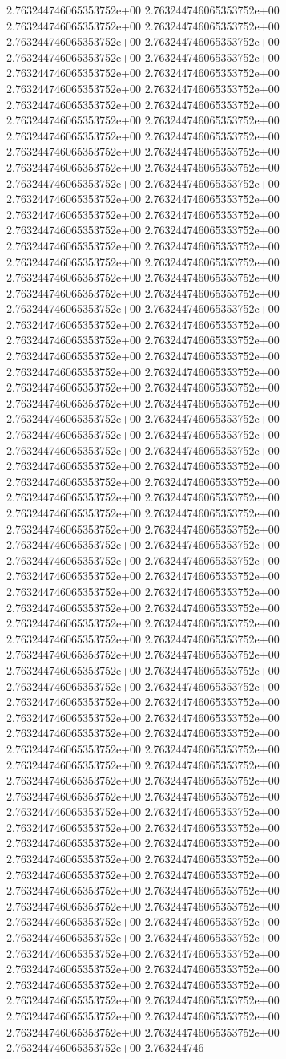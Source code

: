 2.763244746065353752e+00	2.763244746065353752e+00	2.763244746065353752e+00	2.763244746065353752e+00	2.763244746065353752e+00	2.763244746065353752e+00	2.763244746065353752e+00	2.763244746065353752e+00	2.763244746065353752e+00	2.763244746065353752e+00	2.763244746065353752e+00	2.763244746065353752e+00	2.763244746065353752e+00	2.763244746065353752e+00	2.763244746065353752e+00	2.763244746065353752e+00	2.763244746065353752e+00	2.763244746065353752e+00	2.763244746065353752e+00	2.763244746065353752e+00	2.763244746065353752e+00	2.763244746065353752e+00	2.763244746065353752e+00	2.763244746065353752e+00	2.763244746065353752e+00	2.763244746065353752e+00	2.763244746065353752e+00	2.763244746065353752e+00	2.763244746065353752e+00	2.763244746065353752e+00	2.763244746065353752e+00	2.763244746065353752e+00	2.763244746065353752e+00	2.763244746065353752e+00	2.763244746065353752e+00	2.763244746065353752e+00	2.763244746065353752e+00	2.763244746065353752e+00	2.763244746065353752e+00	2.763244746065353752e+00	2.763244746065353752e+00	2.763244746065353752e+00	2.763244746065353752e+00	2.763244746065353752e+00	2.763244746065353752e+00	2.763244746065353752e+00	2.763244746065353752e+00	2.763244746065353752e+00	2.763244746065353752e+00	2.763244746065353752e+00	2.763244746065353752e+00	2.763244746065353752e+00	2.763244746065353752e+00	2.763244746065353752e+00	2.763244746065353752e+00	2.763244746065353752e+00	2.763244746065353752e+00	2.763244746065353752e+00	2.763244746065353752e+00	2.763244746065353752e+00	2.763244746065353752e+00	2.763244746065353752e+00	2.763244746065353752e+00	2.763244746065353752e+00	2.763244746065353752e+00	2.763244746065353752e+00	2.763244746065353752e+00	2.763244746065353752e+00	2.763244746065353752e+00	2.763244746065353752e+00	2.763244746065353752e+00	2.763244746065353752e+00	2.763244746065353752e+00	2.763244746065353752e+00	2.763244746065353752e+00	2.763244746065353752e+00	2.763244746065353752e+00	2.763244746065353752e+00	2.763244746065353752e+00	2.763244746065353752e+00	2.763244746065353752e+00	2.763244746065353752e+00	2.763244746065353752e+00	2.763244746065353752e+00	2.763244746065353752e+00	2.763244746065353752e+00	2.763244746065353752e+00	2.763244746065353752e+00	2.763244746065353752e+00	2.763244746065353752e+00	2.763244746065353752e+00	2.763244746065353752e+00	2.763244746065353752e+00	2.763244746065353752e+00	2.763244746065353752e+00	2.763244746065353752e+00	2.763244746065353752e+00	2.763244746065353752e+00	2.763244746065353752e+00	2.763244746065353752e+00	2.763244746065353752e+00	2.763244746065353752e+00	2.763244746065353752e+00	2.763244746065353752e+00	2.763244746065353752e+00	2.763244746065353752e+00	2.763244746065353752e+00	2.763244746065353752e+00	2.763244746065353752e+00	2.763244746065353752e+00	2.763244746065353752e+00	2.763244746065353752e+00	2.763244746065353752e+00	2.763244746065353752e+00	2.763244746065353752e+00	2.763244746065353752e+00	2.763244746065353752e+00	2.763244746065353752e+00	2.763244746065353752e+00	2.763244746065353752e+00	2.763244746065353752e+00	2.763244746065353752e+00	2.763244746065353752e+00	2.763244746065353752e+00	2.763244746065353752e+00	2.763244746065353752e+00	2.763244746065353752e+00	2.763244746065353752e+00	2.763244746065353752e+00	2.763244746065353752e+00	2.763244746065353752e+00	2.763244746065353752e+00	2.763244746065353752e+00	2.763244746